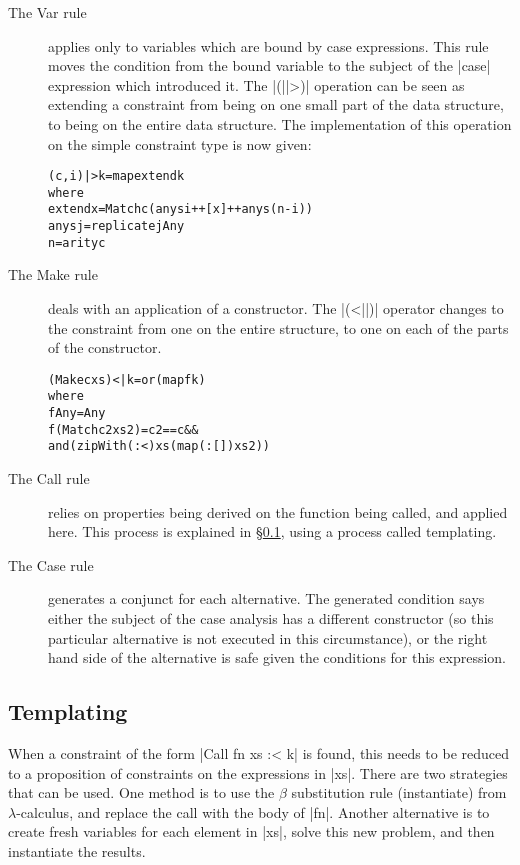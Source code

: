 \documentclass[preprint]{sigplanconf}
\newcommand{\C}[1]{\textsf{#1}}
\newenvironment{code}{\begin{alltt}\small}{\end{alltt}}
\begin{document}
\begin{description}

\item[The \C{Var} rule] applies only to variables which are bound by case expressions. This rule moves the condition from the bound variable to the subject of the |case| expression which introduced it. The |(||>)| operation can be seen as extending a constraint from being on one small part of the data structure, to being on the entire data structure. The implementation of this operation on the simple constraint type is now given:

\begin{code}
(c,i) |> k = map extend k
    where
    extend x = Match c (anys i ++ [x] ++ anys (n-i))
    anys j = replicate j Any
    n = arity c
\end{code}

\item[The \C{Make} rule] deals with an application of a constructor. The |(<||)| operator changes to the constraint from one on the entire structure, to one on each of the parts of the constructor.

\begin{code}
(Make c xs) <| k = or (map f k)
    where
    f Any = Any
    f (Match c2 xs2) = c2 == c &&
        and (zipWith (:<) xs (map (:[]) xs2))
\end{code}

\item[The \C{Call} rule] relies on properties being derived on the function being called, and applied here. This process is explained in \S\ref{sec:template}, using a process called templating.

\item[The \C{Case} rule] generates a conjunct for each alternative. The generated condition says either the subject of the case analysis has a different constructor (so this particular alternative is not executed in this circumstance), or the right hand side of the alternative is safe given the conditions for this expression.
\end{description}


\subsection{Templating}
\label{sec:template}

When a constraint of the form |Call fn xs :< k| is found, this needs to be reduced to a proposition of constraints on the expressions in |xs|. There are two strategies that can be used. One method is to use the $\beta$ substitution rule (\C{instantiate}) from $\lambda$-calculus, and replace the call with the body of |fn|. Another alternative is to create fresh variables for each element in |xs|, solve this new problem, and then instantiate the results.
\end{document}
